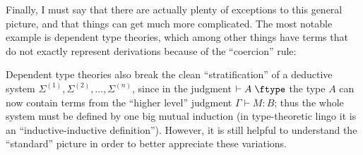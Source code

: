 \documentclass{book}
\def\sig{\Sigma}
\let\types\vdash
\def\type{\;\ftype}
\begin{document}
Finally, I must say that there are actually plenty of exceptions to this general picture, and that things can get much more complicated.
The most notable example is dependent type theories, which among other things have terms that do not exactly represent derivations because of the ``coercion'' rule:
\begin{mathpar}
\end{mathpar}
Dependent type theories also break the clean ``stratification'' of a deductive system $\sig^{(1)},\sig^{(2)},\dots,\sig^{(n)}$, since in the judgment $\types A\type$ the type $A$ can now contain terms from the ``higher level'' judgment $\Gamma\types M:B$; thus the whole system must be defined by one big mutual induction (in type-theoretic lingo it is an ``inductive-inductive definition'').
However, it is still helpful to understand the ``standard'' picture in order to better appreciate these variations.




\end{document}
